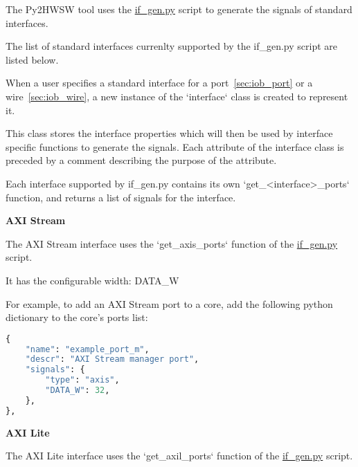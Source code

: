 %

%
%

The Py2HWSW tool uses the \href{https://github.com/IObundle/py2hwsw/blob/main/py2hwsw/scripts/if_gen.py}{if\_gen.py} script to generate the signals of standard interfaces.

The list of standard interfaces currenlty supported by the if\_gen.py script are listed below.


When a user specifies a standard interface for a port~\ref{sec:iob_port} or a wire~\ref{sec:iob_wire}, a new instance of the `interface` class is created to represent it.


This class stores the interface properties which will then be used by interface specific functions to generate the signals.
Each attribute of the interface class is preceded by a comment describing the purpose of the attribute.

Each interface supported by if\_gen.py contains its own `get\_\textless interface\textgreater\_ports` function, and returns a list of signals for the interface.

%
%
\clearpage
\large\textbf{AXI Stream}

The AXI Stream interface uses the `get\_axis\_ports` function of the \href{https://github.com/IObundle/py2hwsw/blob/main/py2hwsw/scripts/if_gen.py}{if\_gen.py} script.


It has the configurable width: DATA\_W

For example, to add an AXI Stream port to a core, add the following python dictionary to the core's ports list:
\begin{lstlisting}[language=python]
{
	"name": "example_port_m",
	"descr": "AXI Stream manager port",
	"signals": {
		"type": "axis",
		"DATA_W": 32,
	},
},
\end{lstlisting}


%
%
\clearpage
\large\textbf{AXI Lite}

The AXI Lite interface uses the `get\_axil\_ports` function of the \href{https://github.com/IObundle/py2hwsw/blob/main/py2hwsw/scripts/if_gen.py}{if\_gen.py} script.

